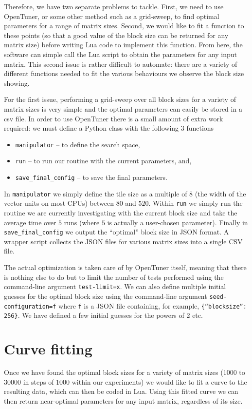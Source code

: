 \documentclass[a4paper,12pt]{article}
\begin{document}
Therefore,
we have two separate problems to tackle.
First,
we need to use OpenTuner,
or some other method such as a grid-sweep,
to find optimal parameters for a range of matrix sizes.
Second,
we would like to fit a function to these points
(so that a good value of the block size
can be returned for any matrix size)
before writing Lua code to implement this function.
From here,
the software can simple call the Lua script to obtain
the parameters for any input matrix.
This second issue is rather difficult to automate:
there are a variety of different functions needed to
fit the various behaviours we observe the block size showing.

For the first issue,
performing a grid-sweep over all block sizes for
a variety of matrix sizes
is very simple and the optimal parameters can easily be
stored in a csv file.
In order to use OpenTuner there is a small amount of
extra work required:
we must define a Python class with the following 3 functions
\begin{itemize}
\item \texttt{manipulator} -- to define the search space,
\item \texttt{run} -- to run our routine with the
  current parameters, and,
\item \texttt{save\_final\_config} -- to save the final parameters.
\end{itemize}

In \texttt{manipulator} we simply define the tile size as a
multiple of $8$ (the width of the vector units on most CPUs)
between $80$ and $520$.
Within \texttt{run} we simply run the routine we are currently
investigating with the current block size and take the average time
over $5$ runs (where $5$ is actually a user-chosen parameter).
Finally in \texttt{save\_final\_config} we output the
``optimal'' block size in JSON format.
A wrapper script collects the JSON files for various matrix sizes
into a single CSV file.

The actual optimization is taken care of by OpenTuner itself,
meaning that there is nothing else to do but to limit
the number of tests performed using the command-line argument
\texttt{\-\-test-limit=x}.
We can also define multiple initial guesses for the optimal
block size using the command-line argument
\texttt{\-\-seed-configuration=f} where \texttt{f} is a JSON
file containing, for example, \texttt{\{``blocksize'': 256\}}.
We have defined a few initial guesses for the powers of 2 etc.

\section{Curve fitting}
\label{sec.curvefitting}
Once we have found the optimal block sizes for a variety of matrix
sizes (1000 to 30000 in steps of 1000 within our experiments)
we would like to fit a curve to the resulting data,
which can then be coded in Lua.
Using this fitted curve we can then return near-optimal
parameters for any input matrix,
regardless of its size.
\end{document}
